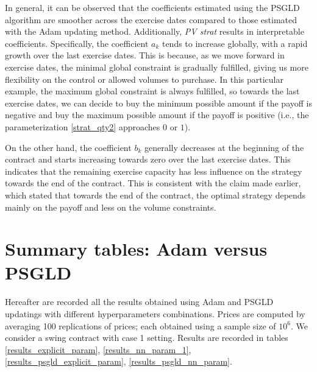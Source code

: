 \documentclass{article}
\numberwithin{equation}{section}
\begin{document}
In general, it can be observed that the coefficients estimated using the PSGLD algorithm are smoother across the exercise dates compared to those estimated with the Adam updating method. Additionally, \textit{PV strat} results in interpretable coefficients. Specifically, the coefficient $a_k$ tends to increase globally, with a rapid growth over the last exercise dates. This is because, as we move forward in exercise dates, the minimal global constraint is gradually fulfilled, giving us more flexibility on the control or allowed volumes to purchase. In this particular example, the maximum global constraint is always fulfilled, so towards the last exercise dates, we can decide to buy the minimum possible amount if the payoff is negative and buy the maximum possible amount if the payoff is positive (i.e., the parameterization \eqref{strat_qty2} approaches $0$ or $1$).

On the other hand, the coefficient $b_k$ generally decreases at the beginning of the contract and starts increasing towards zero over the last exercise dates. This indicates that the remaining exercise capacity has less influence on the strategy towards the end of the contract. This is consistent with the claim made earlier, which stated that towards the end of the contract, the optimal strategy depends mainly on the payoff and less on the volume constraints.



\section{Summary tables: Adam versus PSGLD}
\label{summary_table_algo}

\indent

Hereafter are recorded all the results obtained using Adam and PSGLD updatings with different hyperparameters combinations. Prices are computed by averaging 100 replications of prices; each obtained using a sample size of $10^6$. We consider a swing contract with case 1 setting. Results are recorded in tables \ref{results_explicit_param}, \ref{results_nn_param_1}, \ref{results_psgld_explicit_param}, \ref{results_psgld_nn_param}.
\end{document}
